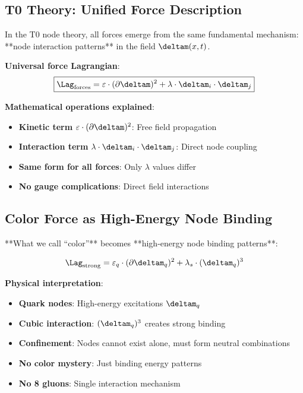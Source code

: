 	\subsection{T0 Theory: Unified Force Description}
	
	In the T0 node theory, all forces emerge from the same fundamental mechanism: **node interaction patterns** in the field $\deltam(x,t)$.
	
	\textbf{Universal force Lagrangian}:
	\begin{equation}
		\boxed{\Lag_{\text{forces}} = \varepsilon \cdot (\partial \deltam)^2 + \lambda \cdot \deltam_i \cdot \deltam_j}
	\end{equation}
	
	\textbf{Mathematical operations explained}:
	\begin{itemize}
		\item \textbf{Kinetic term} $\varepsilon \cdot (\partial \deltam)^2$: Free field propagation
		\item \textbf{Interaction term} $\lambda \cdot \deltam_i \cdot \deltam_j$: Direct node coupling
		\item \textbf{Same form for all forces}: Only $\lambda$ values differ
		\item \textbf{No gauge complications}: Direct field interactions
	\end{itemize}
	
	\subsection{Color Force as High-Energy Node Binding}
	
	**What we call ``color''** becomes **high-energy node binding patterns**:
	
	\begin{equation}
		\Lag_{\text{strong}} = \varepsilon_q \cdot (\partial \deltam_q)^2 + \lambda_s \cdot (\deltam_q)^3
	\end{equation}
	
	\textbf{Physical interpretation}:
	\begin{itemize}
		\item \textbf{Quark nodes}: High-energy excitations $\deltam_q$ 
		\item \textbf{Cubic interaction}: $(\deltam_q)^3$ creates strong binding
		\item \textbf{Confinement}: Nodes cannot exist alone, must form neutral combinations
		\item \textbf{No color mystery}: Just binding energy patterns
		\item \textbf{No 8 gluons}: Single interaction mechanism
	\end{itemize}
	
